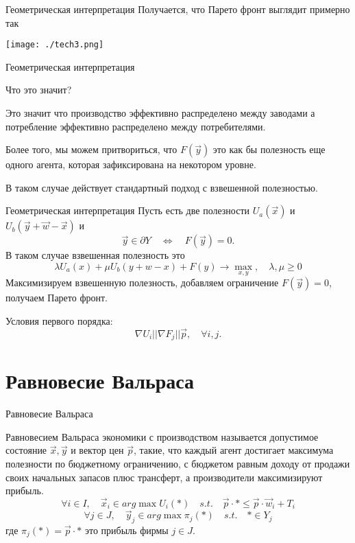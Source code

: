 \documentclass{beamer}
\begin{document}
\begin{frame}{Геометрическая интерпретация}
Получается, что Парето фронт выглядит примерно так
\begin{center}
     \texttt{[image: ./tech3.png]}
     \end{center}

\end{frame}

\begin{frame}{Геометрическая интерпретация}

Что это значит? 

Это значит что производство эффективно распределено между заводами а потребление эффективно распределено между потребителями. 

Более того, мы можем притвориться, что $F(\vec y)$ это как бы полезность еще одного агента, которая зафиксирована на некотором уровне. 

В таком случае действует стандартный подход с взвешенной полезностью.

\end{frame}

\begin{frame}{Геометрическая интерпретация}
Пусть есть две полезности $U_a(\vec x)$ и $U_b(\vec y + \vec w - \vec x)$ и
$$\vec y \in \partial Y \quad \Leftrightarrow \quad F(\vec y) = 0.$$
В таком случае взвешенная полезность это
$$ \lambda U_a(x) + \mu U_b(y + w-x) + F(y) \to \max_{x,y}, \quad \lambda, \mu \geqslant 0$$
Максимизируем взвешенную полезность, добавляем ограничение $F(\vec y) = 0$, получаем Парето фронт.

Условия первого порядка:
$$ \nabla U_i || \nabla F_j || \vec p, \quad \forall i,j.$$ 

\end{frame}

\section{Равновесие Вальраса}

\begin{frame}{Равновесие Вальраса}

\alert{Равновесием Вальраса} экономики с производством называется допустимое состояние $\vec x, \vec y$ и вектор цен $\vec p$, такие, что каждый агент достигает максимума полезности по бюджетному ограничению, с бюджетом равным доходу от продажи своих начальных запасов плюс трансферт, а производители максимизируют прибыль.
$$ \forall i \in I, \quad \vec x_i \in arg \max U_i(*) \quad s.t. \quad \vec p \cdot * \leqslant \vec p \cdot \vec w_i + T_i$$
$$ \forall j \in J, \quad \vec y_j \in arg \max \pi_j(*) \quad s.t. \quad * \in Y_j$$
где $\pi_j(*) = \vec p \cdot *$ это прибыль фирмы $j \in J$. 

\end{frame}
\end{document}

